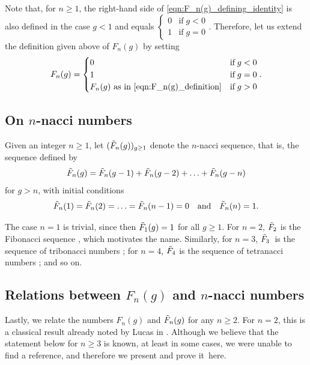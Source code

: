 \documentclass[11pt]{amsart}
\numberwithin{equation}{section}
\theoremstyle{plain}
\newcommand{\<}{\left \langle}
\renewcommand{\>}{\right \rangle}
\theoremstyle{definition}
\theoremstyle{remark}
\begin{document}
Note that, for $n \geq 1$, the right-hand side of \eqref{eqn:F_n(g)_defining_identity} is also defined in the case $g < 1$ and equals  $\begin{cases}
0& \text{if}\; g < 0 \\
1& \text{if}\; g = 0
\end{cases}$. Therefore, let us extend the definition given above of $F_n(g)$ by setting 
\begin{equation}
F_n(g) = \begin{cases}
0& \text{if}\; g < 0 \\
1& \text{if}\; g = 0 \\
F_n(g) \text{ as in }\eqref{eqn:F_n(g)_definition}& \text{if}\; g >0
\end{cases}.
\label{eqn:F_n(g)_definitioF_modified}
\end{equation}

\subsection{On $n$-nacci numbers}
\label{subsection::nbonacci}
Given an integer $n \geq 1$, let $(\Tilde{F}_n(g))_{g \geq 1}$ denote the $n$-nacci sequence, that is, the sequence defined by 
$$\Tilde{F}_n(g) = \Tilde{F}_n(g - 1) + \Tilde{F}_n(g - 2) + \ldots + \Tilde{F}_n(g - n)$$ for $g > n$, 
with initial conditions $$\Tilde{F}_n(1) = \Tilde{F}_n(2) = \ldots = \Tilde{F}_n(n - 1) = 0\quad \text{and}\quad \Tilde{F}_n(n) = 1.$$ 

The case $n = 1$ is trivial, since then $\Tilde{F}_1(g) = 1$ for all $g \geq 1$. 
For $n = 2$, $\Tilde{F}_2$ is the Fibonacci sequence \cite[A000045]{oeis}, which motivates the name. 
Similarly, for $n = 3$, $\Tilde{F}_3$~is the sequence of tribonacci numbers \cite[A000073]{oeis}; for $n = 4$, $\Tilde{F}_4$ is the sequence of tetranacci numbers \cite[A000078]{oeis}; and so on.


\subsection{Relations between $F_n(g)$ and $n$-nacci numbers}

Lastly, we relate the numbers $F_n(g)$ and $\Tilde{F}_n(g)$ for any $n \geq 2$. For $n = 2$, this is a classical result already noted by Lucas in \cite[p.~7]{luc}. Although we believe that the statement below for $n \geq 3$ is known, at least in some cases, we were unable to find a reference, and therefore we present and prove it~here.
\end{document}
